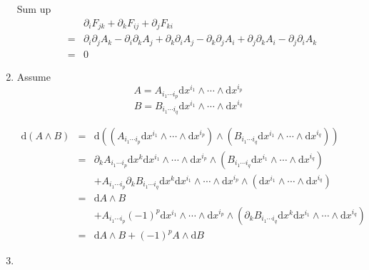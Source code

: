 \documentclass[12pt,a4paper]{article}
\begin{document}
\begin{enumerate}
Sum up
\begin{eqnarray}
	&&\partial_i F_{jk} + \partial_k F_{ij} +\partial_j F_{ki} \\
	&=& \partial_i\partial_j A_k - \partial_i\partial_k A_j + \partial_k\partial_i A_j - \partial_k\partial_j A_i +  \partial_j\partial_k A_i - \partial_j\partial_i A_k \\
	&=& 0
\end{eqnarray}








\item

Assume
\begin{equation}
	A = A_{i_1\cdots i_p} \mathrm dx^{i_1}\wedge\cdots \wedge \mathrm dx^{i_p}
\end{equation}
\begin{equation}
	B = B_{i_1\cdots i_q} \mathrm dx^{i_1}\wedge \cdots\wedge \mathrm dx^{i_q}
\end{equation}

\begin{eqnarray*}
	\mathrm d(A\wedge B) &=& \mathrm d((A_{i_1\cdots i_p} \mathrm dx^{i_1}\wedge\cdots \wedge \mathrm dx^{i_p}) \wedge (B_{i_1\cdots i_q}  \mathrm dx^{i_1}\wedge \cdots\wedge \mathrm dx^{i_q})) \\
	&=& \partial_k A_{i_1\cdots i_p} \mathrm dx^k   \mathrm dx^{i_1}\wedge\cdots \wedge \mathrm dx^{i_p}  \wedge (B_{i_1\cdots i_q}  \mathrm dx^{i_1}\wedge \cdots\wedge \mathrm dx^{i_q})  \\
	&&+ A_{i_1\cdots i_p} \partial_k B_{i_1\cdots i_q} \mathrm dx^k   \mathrm dx^{i_1}\wedge\cdots \wedge \mathrm dx^{i_p}  \wedge (\mathrm dx^{i_1}\wedge \cdots\wedge \mathrm dx^{i_q})  \\
	&=& \mathrm d A  \wedge B  \\
	&& + A_{i_1\cdots i_p} (-1)^p   \mathrm dx^{i_1}\wedge\cdots \wedge \mathrm dx^{i_p}  \wedge (\partial_k B_{i_1\cdots i_q} \mathrm dx^k  \mathrm dx^{i_1}\wedge \cdots\wedge \mathrm dx^{i_q})   \\
	&=&  \mathrm d A  \wedge B   + (-1)^p A\wedge \mathrm d B
\end{eqnarray*}



\item


\end{enumerate}
\end{document}
